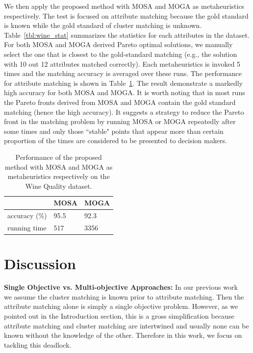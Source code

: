 We then apply the proposed method with MOSA and MOGA as metaheuristics respectively. The test is focused on attribute matching because the gold standard is known while the gold standard of cluster matching is unknown. Table~\ref{tbl:wine_stat} summarizes the statistics for each attributes in the dataset. For both MOSA and MOGA derived Pareto optimal solutions, we manually select the one that is closest to the gold-standard matching (e.g., the solution with 10 out 12 attributes matched correctly). Each metaheuristics is invoked 5 times and the matching accuracy is averaged over these runs. The performance for attribute matching is shown in Table~\ref{tbl:wine_res}. The result demonstrate a markedly high accuracy for both MOSA and MOGA. It is worth noting that in most runs the Pareto fronts derived from MOSA and MOGA contain the gold standard matching (hence the high accuracy). It suggests a strategy to reduce the Pareto front in the matching problem by running MOSA or MOGA repeatedly after some times and only those ``stable" points that appear more than certain proportion of the times are considered to be presented to decision makers.

\begin{table}[tbh]
\begin{center}
\begin{tabular}{l|l|l}
\hline
                &   MOSA    &   MOGA    \\
\hline
accuracy (\%)   &    95.5   &   92.3    \\
running time    &    517    &   3356    \\
\hline
\end{tabular}
\end{center}
\caption[The performance of MOSA and MOGA on the Wine Quality dataset]{\label{tbl:wine_res} Performance of the proposed method with MOSA and MOGA as metaheuristics respectively on the Wine Quality dataset.}
\end{table}


\section{Discussion}
\label{sec:discussion}
\textbf{Single Objective vs. Multi-objective Approaches:}
In our previous work~\cite{LiuEtal10,LiuEtalNEUCOM12} we assume the cluster matching is known prior to attribute matching. Then the attribute matching alone is simply a single objective problem. However, as we pointed out in the Introduction section, this is a gross simplification because attribute matching and cluster matching are intertwined and usually none can be known without the knowledge of the other. Therefore in this work, we focus on tackling this deadlock.

